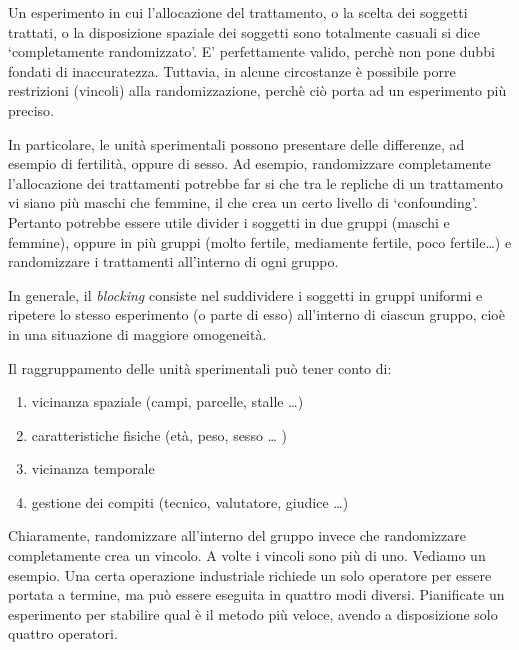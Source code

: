 \documentclass[a4paper,12pt,oneside]{book}
\providecommand{\tightlist}{%
  \setlength{\itemsep}{0pt}\setlength{\parskip}{0pt}}
\begin{document}
Un esperimento in cui l'allocazione del trattamento, o la scelta dei
soggetti trattati, o la disposizione spaziale dei soggetti sono
totalmente casuali si dice `completamente randomizzato'. E'
perfettamente valido, perchè non pone dubbi fondati di inaccuratezza.
Tuttavia, in alcune circostanze è possibile porre restrizioni (vincoli)
alla randomizzazione, perchè ciò porta ad un esperimento più preciso.

In particolare, le unità sperimentali possono presentare delle
differenze, ad esempio di fertilità, oppure di sesso. Ad esempio,
randomizzare completamente l'allocazione dei trattamenti potrebbe far si
che tra le repliche di un trattamento vi siano più maschi che femmine,
il che crea un certo livello di `confounding'. Pertanto potrebbe essere
utile divider i soggetti in due gruppi (maschi e femmine), oppure in più
gruppi (molto fertile, mediamente fertile, poco fertile\ldots{}) e
randomizzare i trattamenti all'interno di ogni gruppo.

In generale, il \emph{blocking} consiste nel suddividere i soggetti in
gruppi uniformi e ripetere lo stesso esperimento (o parte di esso)
all'interno di ciascun gruppo, cioè in una situazione di maggiore
omogeneità.

Il raggruppamento delle unità sperimentali può tener conto di:

\begin{enumerate}
\def\labelenumi{\arabic{enumi}.}
\tightlist
\item
  vicinanza spaziale (campi, parcelle, stalle \ldots{})
\item
  caratteristiche fisiche (età, peso, sesso \ldots{} )
\item
  vicinanza temporale
\item
  gestione dei compiti (tecnico, valutatore, giudice \ldots{})
\end{enumerate}

Chiaramente, randomizzare all'interno del gruppo invece che randomizzare
completamente crea un vincolo. A volte i vincoli sono più di uno.
Vediamo un esempio. Una certa operazione industriale richiede un solo
operatore per essere portata a termine, ma può essere eseguita in
quattro modi diversi. Pianificate un esperimento per stabilire qual è il
metodo più veloce, avendo a disposizione solo quattro operatori.
\end{document}
